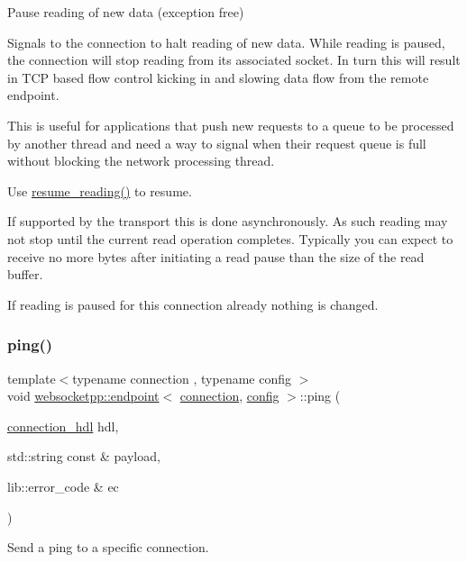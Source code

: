 Pause reading of new data (exception free) 

Signals to the connection to halt reading of new data. While reading is paused, the connection will stop reading from its associated socket. In turn this will result in T\+CP based flow control kicking in and slowing data flow from the remote endpoint.

This is useful for applications that push new requests to a queue to be processed by another thread and need a way to signal when their request queue is full without blocking the network processing thread.

Use {\ttfamily \mbox{\hyperlink{classwebsocketpp_1_1endpoint_a9753aaade09c9a7a0efd459861ba3b97}{resume\+\_\+reading()}}} to resume.

If supported by the transport this is done asynchronously. As such reading may not stop until the current read operation completes. Typically you can expect to receive no more bytes after initiating a read pause than the size of the read buffer.

If reading is paused for this connection already nothing is changed. \mbox{\label{classwebsocketpp_1_1endpoint_a1d4bcbc3fcd87f48120fbb421467f414}} 
\subsubsection{\texorpdfstring{ping()}{ping()}\hspace{0.1cm}{\footnotesize\ttfamily [1/2]}}
{\footnotesize\ttfamily template$<$typename connection , typename config $>$ \\
void \mbox{\hyperlink{classwebsocketpp_1_1endpoint}{websocketpp\+::endpoint}}$<$ \mbox{\hyperlink{classwebsocketpp_1_1connection}{connection}}, \mbox{\hyperlink{classconfig}{config}} $>$\+::ping (\begin{DoxyParamCaption}\item[{\mbox{\hyperlink{namespacewebsocketpp_a6b3d26a10ee7229b84b776786332631d}{connection\+\_\+hdl}}}]{hdl,  }\item[{std\+::string const \&}]{payload,  }\item[{lib\+::error\+\_\+code \&}]{ec }\end{DoxyParamCaption})}



Send a ping to a specific connection. 

